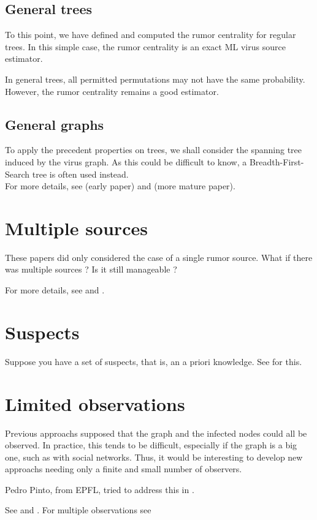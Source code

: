 \documentclass[10pt,a4paper]{article}
\begin{document}
\subsection{General trees}
To this point, we have defined and computed the rumor centrality for regular trees. In this simple case, the rumor centrality is an exact ML virus source estimator.

In general trees, all permitted permutations may not have the same probability. However, the rumor centrality remains a good estimator. 

\subsection{General graphs}
To apply the precedent properties on trees, we shall consider the spanning tree induced by the virus graph. As this could be difficult to know, a Breadth-First-Search tree is often used instead.
\\

For more details, see \cite{shah1} (early paper) and \cite{shah2} (more mature paper).

\section{Multiple sources}
These papers did only considered the case of a single rumor source. What if there was multiple sources ? Is it still manageable ?

For more details, see \cite{luo1} and \cite{chen1}.

\section{Suspects}
Suppose you have a set of suspects, that is, an a priori knowledge. See \cite{dong1} for this.

\section{Limited observations}
Previous approachs supposed that the graph and the infected nodes could all be observed. In practice, this tends to be difficult, especially if the graph is a big one, such as with social networks. Thus, it would be interesting to develop new approachs needing only a finite and small number of observers.

Pedro Pinto, from EPFL, tried to address this in \cite{pinto}.


See \cite{seo1} and \cite{pinto}. For multiple observations see \cite{dong2}
\end{document}
